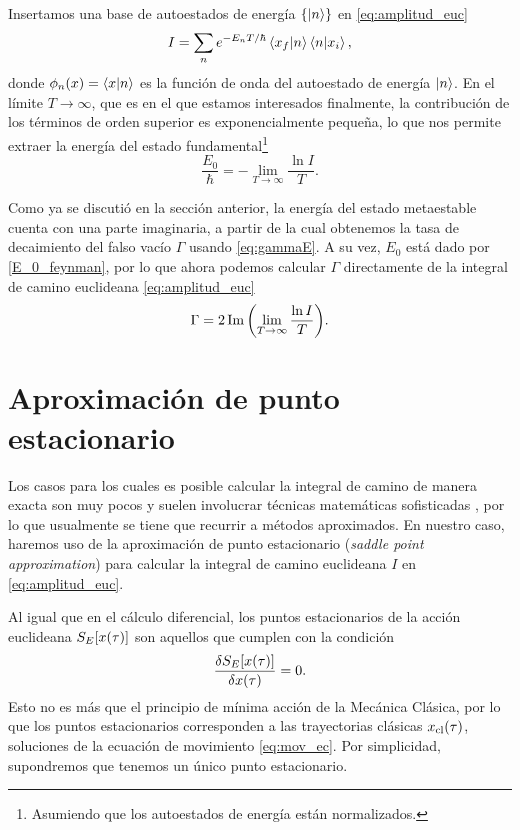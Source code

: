 Insertamos una base de autoestados de energía $\qty{\ket{n}}$ en \eqref{eq:amplitud_euc} \cite{coleman1977fate}
\begin{equation}\label{eq:Eeigen}
I = \sum_n e^{-E_n T/\hbar} \bra{x_f}\ket{n}\bra{n}\ket{x_i}, 
\end{equation}
donde $\phi_n\qty(x) = \bra{x}\ket{n}$ es la función de onda del autoestado de energía $\ket{n}$. En el límite $T \rightarrow \infty$, que es en el que estamos interesados finalmente, la contribución de los términos de orden superior es exponencialmente pequeña, lo que nos permite extraer la energía del estado fundamental\footnote{Asumiendo que los autoestados de energía están normalizados.} \cite{andreassen2017precision}
\begin{equation} \label{E_0_feynman}
	\frac{E_0}{\hbar} = -\lim_{T \rightarrow \infty} \frac{ \ln I}{T}.
\end{equation}

Como ya se discutió en la sección anterior,  %
la energía del estado metaestable cuenta con una parte imaginaria, a partir de la cual obtenemos la tasa de decaimiento del falso vacío $\Gamma$ usando \eqref{eq:gammaE}. A su vez, $E_0$ está dado por \eqref{E_0_feynman}, por lo que ahora podemos calcular $\Gamma$ directamente de la integral de camino euclideana \eqref{eq:amplitud_euc}
\begin{equation} \label{eq:Gamma}
	\Gamma = 2\Im\qty(\lim_{T \rightarrow \infty} \frac{ \ln I}{T}).
\end{equation}

\section{Aproximación de punto estacionario}

Los casos para los cuales es posible calcular la integral de camino de manera exacta son muy pocos y suelen involucrar técnicas matemáticas sofisticadas \cite{feynman2010quantum, das2006field, kleinert2009path}, por lo que usualmente se tiene que recurrir a métodos aproximados. En nuestro caso, haremos uso de la aproximación de punto estacionario (\emph{saddle point approximation}) para calcular la integral de camino euclideana $I$ en \eqref{eq:amplitud_euc}. 

Al igual que en el cálculo diferencial, los puntos estacionarios de la acción euclideana $S_E\qty[x\qty(\tau)]$ son aquellos que cumplen con la condición
\begin{equation}\label{eq:minimo}
	\fdv{S_E\qty[x\qty(\tau)]}{x\qty(\tau)} = 0.
\end{equation}
Esto no es más que el principio de mínima acción de la Mecánica Clásica, por lo que los puntos estacionarios corresponden a las trayectorias clásicas $x_{\text{cl}}\qty(\tau)$, soluciones de la ecuación de movimiento \eqref{eq:mov_ec}. Por simplicidad, supondremos que tenemos un único punto estacionario.

